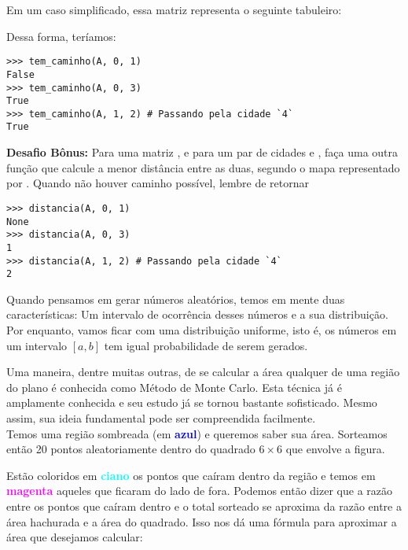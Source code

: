 \documentclass[12pt]{article}
\begin{document}
	Em um caso simplificado, essa matriz representa o seguinte tabuleiro:
	
	
	
	Dessa forma, teríamos:
	\begin{lstlisting}
>>> tem_caminho(A, 0, 1)
False
>>> tem_caminho(A, 0, 3)
True
>>> tem_caminho(A, 1, 2) # Passando pela cidade `4`
True
	\end{lstlisting}

	\textbf{Desafio Bônus:} Para uma matriz , e para um par de cidades  e , faça uma outra função que calcule a menor distância entre as duas, segundo o mapa representado por . Quando não houver caminho possível, lembre de retornar \\
	
	\example
	\begin{lstlisting}
>>> distancia(A, 0, 1)
None
>>> distancia(A, 0, 3)
1
>>> distancia(A, 1, 2) # Passando pela cidade `4`
2
	\end{lstlisting}

	\pagebreak
	
	
	Quando pensamos em gerar números aleatórios, temos em mente duas características: Um intervalo de ocorrência desses números e a sua distribuição. Por enquanto, vamos ficar com uma distribuição uniforme, isto é, os números em um intervalo $[a, b]$ tem igual probabilidade de serem gerados.
	
	 
	
	\pagebreak
	
	
	Uma maneira, dentre muitas outras, de se calcular a área qualquer de uma região do plano é conhecida como Método de Monte Carlo. Esta técnica já é amplamente conhecida e seu estudo já se tornou bastante sofisticado. Mesmo assim, sua ideia fundamental pode ser compreendida facilmente.\\
	
	Temos uma região sombreada (em \textbf{\textcolor{blue}{azul}}) e queremos saber sua área. Sorteamos então 20 pontos aleatoriamente dentro do quadrado $6 \times 6$ que envolve a figura.
	
	
	
	Estão coloridos em \textbf{\textcolor{cyan}{ciano}} os pontos que caíram dentro da região e temos em \textbf{\textcolor{magenta}{magenta}} aqueles que ficaram do lado de fora. Podemos então dizer que a razão entre os pontos que caíram dentro e o total sorteado se aproxima da razão entre a área hachurada e a área do quadrado. Isso nos dá uma fórmula para aproximar a área que desejamos calcular:
	
\end{document}

